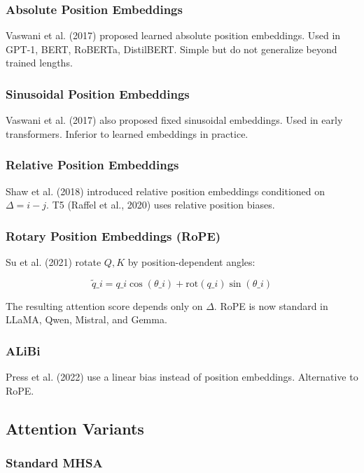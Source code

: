 \subsubsection{Absolute Position Embeddings}

Vaswani et al. (2017) proposed learned absolute position embeddings. Used 
in GPT-1, BERT, RoBERTa, DistilBERT. Simple but do not generalize beyond 
trained lengths.

\subsubsection{Sinusoidal Position Embeddings}

Vaswani et al. (2017) also proposed fixed sinusoidal embeddings. Used in 
early transformers. Inferior to learned embeddings in practice.

\subsubsection{Relative Position Embeddings}

Shaw et al. (2018) introduced relative position embeddings conditioned on 
$\Delta = i - j$. T5 (Raffel et al., 2020) uses relative position biases.

\subsubsection{Rotary Position Embeddings (RoPE)}

Su et al. (2021) rotate $Q, K$ by position-dependent angles:

\[
\tilde{q}\_i = q\_i \cos(\theta\_i) + \mathrm{rot}(q\_i) \sin(\theta\_i)
\tag{2.1}
\]

The resulting attention score depends only on $\Delta$. RoPE is now 
standard in LLaMA, Qwen, Mistral, and Gemma.

\subsubsection{ALiBi}

Press et al. (2022) use a linear bias instead of position embeddings. 
Alternative to RoPE.

\subsection{Attention Variants}

\subsubsection{Standard MHSA}

